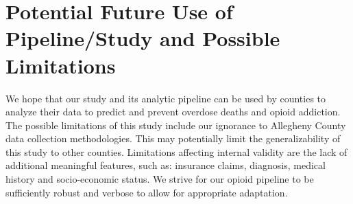 \documentclass[twoside,10.5pt]{article}
\begin{document}
\section{Potential Future Use of Pipeline/Study and Possible Limitations}
We hope that our study and its analytic pipeline can be used by counties to analyze their data to predict and prevent overdose deaths and opioid addiction. The possible limitations of this study include our ignorance to Allegheny County data collection methodologies. This may potentially limit the generalizability of this study to other counties. Limitations affecting internal validity are the lack of additional meaningful features, such as: insurance claims,  diagnosis, medical history and socio-economic status. We strive for our opioid pipeline to be sufficiently robust and verbose to allow for appropriate adaptation.


\newpage
\theendnotes



\end{document}
